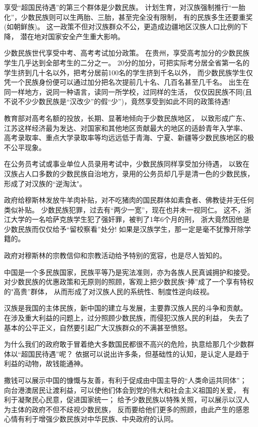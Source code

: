 \documentclass[UTF8, 11pt, oneside]{ctexart}
\begin{document}
享受“超国民待遇”的第三个群体是少数民族。
计划生育，对汉族强制推行“一胎化”，少数民族则可以生两胎、三胎，甚至完全没有限制，
有的民族多生还要重奖(如朝鲜族)。
这一政策不但对汉族群众不公，更造成边疆地区汉族人口比例的下降，
潜在地对国家安全产生重大影响。

少数民族世代享受中考、高考考试加分政策。
在贵州，享受高考加分的少数民族学生几乎达到全部考生的二分之一。
20分的加分，可把实际考分居全省第一名的学生挤到几十名以外，把考分居前100名的学生挤到千名以外，
而少数民族学生仅凭一个民族身份便可以通过加分把名次提前几十名、几百名甚至几千名。
出生在同一样地方，说同一种语言，读同一所学校，过同样的生活，
仅仅因民族不同(且不说不少少数民族是“汉改少”的假“少”)，竟然享受到如此不同的政策待遇!

教育部对高考名额的投放，长期、显著地倾向于少数民族地区，
以致形成广东、江苏这样经济最为发达、对国家和其他地区贡献最大的地区的适龄青年入学率、
高考录取率、重点大学录取率等均远远低于青海、宁夏、新疆等少数民族地区的极不公平现象。

在公务员考试或事业单位人员录用考试中，少数民族同样享受加分待遇，
以致在汉族占人口多数的少数民族自治地方，录用的公务员却几乎是清一色的少数民族，
形成了对汉族的“逆淘汰"。

政府给穆斯林发放牛羊肉补贴，对不吃猪肉的国民群体如素食者、佛教徒并无任何类似补贴。
少数民族犯罪，过去有“两少一宽”，现在也并未一视同仁。
这不，浙江大学的一名哈萨克族学生犯了强奸罪，被判了1年6个月的刑，
浙大竟然因他是少数民族而仅仅给予“留校察看”处分!
如果是汉族学生，那一定是毫不犹豫开除学籍的。

政府对穆斯林的宗教信仰和宗教活动给予特别的宽容，也是尽人皆知的。

中国是一个多民族国家，民族平等乃是宪法准则，亦为各族人民真诚拥护和接受。
对少数民族的优惠政策和无原则的照顾，客观上把少数民族“捧”成了一个享有特权的"高贵”群体，
从而形成了对汉族人民的系统性、制度性逆向歧视。

汉族是我国的主体民族，新中国的建立与发展，主要靠汉族人民的斗争和贡献。
在涉及重大利益的问题上，过分照顾少数民族，而侵犯汉族人民的利益，
失去了基本的公平正义，自然要引起广大汉族群众的不满甚至愤怒。

为什么我们的政府敢于冒着绝大多数国民都很不高兴的危险，执意给那几个少数群体以“超国民待遇”呢？
依据可以说出许多条，但基础性的认知，是认定人是趋于利益的动物，故钱能通神。

撒钱可以展示中国的慷慨与友善，有利于促成由中国主导的“人类命运共同体”；
向台港澳居民让渡利益，可以使他们体会到党的伟大和社会主义祖国的关爱，
有利于凝聚民心民意，促进国家统一；
给予少数民族以特殊关照，可以展示以汉人为主体的政府不但不歧视少数民族，
反而要给他们更多的照顾，由此产生的感恩心情有利于增强少数民族对中华民族、中央政府的认同。
\end{document}
